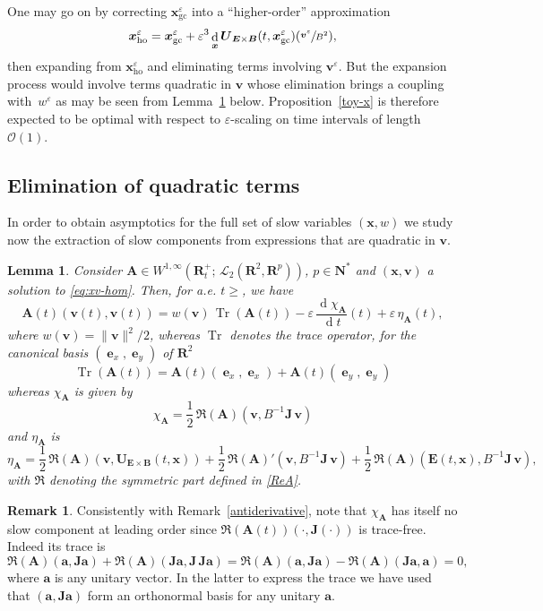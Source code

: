 \documentclass[JEP,XML,SOM,Unicode]{cedram}
\let\mathcal\mathscr
\let\eps\varepsilon
\DeclareMathOperator\dD{d}\let\dd\dD
\DeclareMathOperator{\Tr}{Tr}
\theoremstyle{plain}
\newtheorem{lemma}[theorem]{Lemma}
\theoremstyle{definition}
\newtheorem{remark}[theorem]{Remark}
\newcommand\br{\begin{remark}}
\newcommand\er{\end{remark}}
\newcommand{\bl}{\begin{lemma}}
\newcommand{\el}{\end{lemma}}
\newcommand\R{\mathbf R}
\newcommand{\N}{\mathbf N}
\newcommand\bA{{\boldsymbol A}}
\newcommand\bB{{\boldsymbol B}}
\newcommand\bE{{\boldsymbol E}}
\newcommand\bJ{{\boldsymbol J}}
\newcommand\bU{{\boldsymbol U}}
\newcommand\bfa{{\boldsymbol a}}
\newcommand\bfv{{\boldsymbol v}}
\newcommand\bfx{{\boldsymbol x}}
\newcommand\cL{{\mathcal L}}
\newcommand\cO{{\mathcal O}}
\DeclareMathOperator{\beD}{\boldsymbol{e}}
\newcommand\eDx{\beD_x}
\newcommand\eDy{\beD_y}
\let\e w
\newcommand{\GC}{\bfx_\mathrm{gc}}
\newcommand{\EcB}{\bU_{\bE\times\bB}}
\begin{document}
One may go on by correcting $\GC^\eps$ into a ``higher-order'' approximation
\[
\bfx_\mathrm{ho}^\eps
=\GC^\eps+\eps^3\dD_\bfx\EcB(t,\GC^\eps)(\sfrac{\bfv^\eps}{B^2}),
\]
then expanding from $\bfx_\mathrm{ho}^\eps$ and eliminating terms involving $\bfv^\eps$. But the expansion process would involve terms quadratic in $\bfv$ whose elimination brings a coupling with~$\e^\eps$ as may be seen from Lemma~\ref{toy-2nd} below. Proposition~\ref{toy-x} is therefore expected to be optimal with respect to $\eps$-scaling on time intervals of length $\cO(1)$.

\subsection{Elimination of quadratic terms}

In order to obtain asymptotics for the full set of slow variables $(\bfx,\e)$ we study now the extraction of slow components from expressions that are quadratic in $\bfv$.

\bl
\label{toy-2nd}
Consider $\bA\in W^{1,\infty}\left(\R^+_t; \,\cL_2(\R^2,\R^p)\right)$, $p\in\N^*$ and $(\bfx,\bfv)$ a solution to \eqref{eq:xv-hom}. Then, for
a.e. $t\geq$, we have
\[
\bA(t)(\bfv(t),\bfv(t))
=\e(\bfv)\,\Tr(\bA(t))-\eps\,\frac{\dD\chi_\bA}{\dD t}(t)+\eps\,\eta_\bA(t),
\]
where $\e(\bfv)=\|\bfv\|^2/2$, whereas $\Tr$ denotes the trace
operator, for the canonical basis $(\eDx,\eDy)$ of $\R^2$
\[
\Tr(\bA(t)) = \bA(t)(\eDx,\eDx) + \bA(t)(\eDy,\eDy)
\]
whereas $\chi_\bA$ is given by
\[
\chi_\bA =\frac12\,\Re(\bA)\left(\bfv,B^{-1}\bJ\,\bfv\right)
\]
and $\eta_\bA$ is
\[
\eta_\bA =
\frac12\,\Re(\bA)(\bfv,\EcB(t,\bfx))
+\frac12\,\Re(\bA)'\left(\bfv,B^{-1}\bJ\,\bfv\right)+\frac12\,\Re(\bA)\left(\bE(t,\bfx),B^{-1}\bJ\,\bfv\right),
\]
with $\Re$ denoting the symmetric part defined in \eqref{ReA}.
\el

\br
\label{trace-free}
Consistently with Remark~\ref{antiderivative}, note that $\chi_\bA$ has itself no slow component at leading order since $\Re(\bA(t))\left(\cdot,\bJ(\cdot)\right)$ is trace-free. Indeed its trace is
\[
\Re(\bA)\left(\bfa,\bJ\bfa\right)+\Re(\bA)\left(\bJ\bfa,\bJ\,\bJ\bfa\right)
=\Re(\bA)\left(\bfa,\bJ\bfa\right)-\Re(\bA)\left(\bJ\bfa,\bfa\right)=0,
\]
where $\bfa$ is any unitary vector. In the latter to express the trace we have used that $(\bfa,\bJ\bfa)$ form an orthonormal basis for any unitary $\bfa$.
\er
\end{document}

